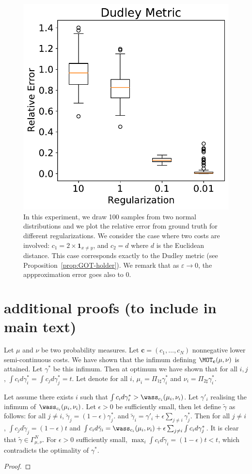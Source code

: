 \begin{figure}[h!]
\centering
\includegraphics[width=0.6\linewidth]{figures/box_plot_accuracy.pdf}
\caption{In this experiment, we draw 100 samples from two normal distributions and we plot the relative error from ground truth for different regularizations. We consider the case where two costs are involved: $c_1= 2\times\mathbf{1}_{x\neq y}$, and $c_2=d$ where $d$ is the Euclidean distance. This case corresponds exactly to the Dudley metric (see Proposition~\ref{prop:GOT-holder}). We remark that as $\varepsilon\to 0$, the appproximation error goes also to $0$.\label{fig:result_acc}}
\end{figure}



\section{additional proofs (to include in main text)}

\begin{prv*}
Let $\mu$ and $\nu$ be two probability measures. Let $\mathbf{c}=(c_1,\dots,c_N)$ nonnegative lower semi-continuous costs. We have shown that the infimum defining $\MOT_\mathbf{c}(\mu,\nu)$ is attained. Let $\gamma^*$ be this infimum. Then at optimum we have shown that for all $i,j$, $\int c_id\gamma^*_i=\int c_jd\gamma^*_j = t$. Let denote for all $i$, $\mu_i=\Pi_{1\sharp}\gamma^*_i$ and $\nu_i=\Pi_{2\sharp}\gamma^*_i$. 

Let assume there exists $i$ such that $\int c_i d\gamma^*_i>\wass_{c_i}(\mu_i,\nu_i)$. Let $\gamma'_i$ realising the infimum of $\wass_{c_i}(\mu_i,\nu_i)$. Let $\epsilon>0$ be sufficiently small, then let define $\tilde{\gamma}$ as follows: for all $j\neq i$, $\tilde{\gamma}_j=(1-\epsilon)\gamma^*_j$. and $\tilde{\gamma}_i = \gamma'_i+\epsilon \sum_{j\neq i}\gamma^*_j$.
Then for all $j\neq i$, $\int c_j d \tilde{\gamma}_j = (1-\epsilon) t$ and $\int c_i d \tilde{\gamma}_i = \wass_{c_i}(\mu_i,\nu_i)+\epsilon \sum_{j\neq i} \int c_id\gamma^*_j$. It is clear that $\tilde{\gamma}\in \Gamma^N_{\mu,\nu}$. For $\epsilon>0$ sufficiently small, $\max_i\int c_id\tilde{\gamma}_i = (1-\epsilon) t<t$, which contradicts the optimality of $\gamma^*$.
\end{prv*}


\begin{proof}
\end{proof}
